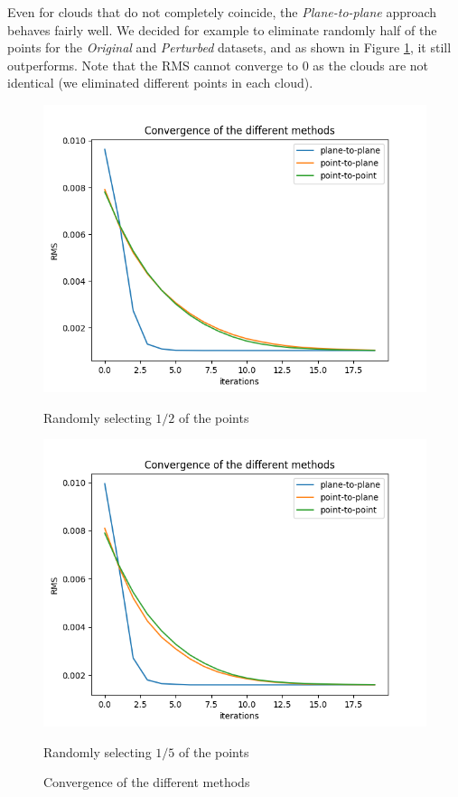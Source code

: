 \documentclass[11pt,letterpaper,leqno]{article}
\begin{document}
Even for clouds that do not completely coincide, the \textit{Plane-to-plane} approach behaves fairly well. We decided for example to eliminate randomly half of the points for the \textit{Original} and \textit{Perturbed} datasets, and as shown in Figure \ref{fig:comp3}, it still outperforms. Note that the RMS cannot converge to $0$ as the clouds are not identical (we eliminated different points in each cloud).

\begin{figure}[ht!]
    \centering
    \begin{minipage}{0.5\linewidth}
    \includegraphics[width=\linewidth]{img/comparison_3.png}
    \caption{Randomly selecting $1/2$ of the points}
    \end{minipage}\hfill
    \begin{minipage}{0.5\linewidth}
    \includegraphics[width=\linewidth]{img/comparison_4.png}
    \caption{Randomly selecting $1/5$ of the points}
    \end{minipage}
    \caption{Convergence of the different methods}
    \label{fig:comp3}
\end{figure}
\end{document}
